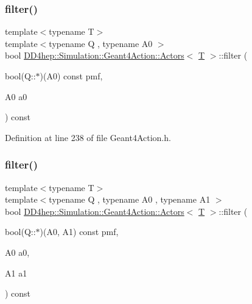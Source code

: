 \hypertarget{class_d_d4hep_1_1_simulation_1_1_geant4_action_1_1_actors_a3c8c401d4e25a2dbb05650688a904f46}{}\label{class_d_d4hep_1_1_simulation_1_1_geant4_action_1_1_actors_a3c8c401d4e25a2dbb05650688a904f46} 
\subsubsection{\texorpdfstring{filter()}{filter()}\hspace{0.1cm}{\footnotesize\ttfamily [2/3]}}
{\footnotesize\ttfamily template$<$typename T$>$ \\
template$<$typename Q , typename A0 $>$ \\
bool \hyperlink{class_d_d4hep_1_1_simulation_1_1_geant4_action_1_1_actors}{D\+D4hep\+::\+Simulation\+::\+Geant4\+Action\+::\+Actors}$<$ \hyperlink{class_t}{T} $>$\+::filter (\begin{DoxyParamCaption}\item[{bool(Q\+::$\ast$)(A0) const}]{pmf,  }\item[{A0}]{a0 }\end{DoxyParamCaption}) const\hspace{0.3cm}{\ttfamily [inline]}}



Definition at line 238 of file Geant4\+Action.\+h.

\hypertarget{class_d_d4hep_1_1_simulation_1_1_geant4_action_1_1_actors_a572356a2f816bfbacf017978236730f0}{}\label{class_d_d4hep_1_1_simulation_1_1_geant4_action_1_1_actors_a572356a2f816bfbacf017978236730f0} 
\subsubsection{\texorpdfstring{filter()}{filter()}\hspace{0.1cm}{\footnotesize\ttfamily [3/3]}}
{\footnotesize\ttfamily template$<$typename T$>$ \\
template$<$typename Q , typename A0 , typename A1 $>$ \\
bool \hyperlink{class_d_d4hep_1_1_simulation_1_1_geant4_action_1_1_actors}{D\+D4hep\+::\+Simulation\+::\+Geant4\+Action\+::\+Actors}$<$ \hyperlink{class_t}{T} $>$\+::filter (\begin{DoxyParamCaption}\item[{bool(Q\+::$\ast$)(A0, A1) const}]{pmf,  }\item[{A0}]{a0,  }\item[{A1}]{a1 }\end{DoxyParamCaption}) const\hspace{0.3cm}{\ttfamily [inline]}}



